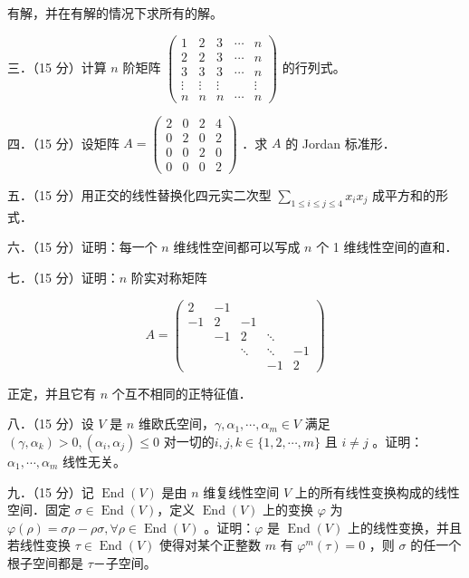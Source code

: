 \documentclass{article}
\begin{document}
有解，并在有解的情况下求所有的解。

三．（15 分）计算 \(n\) 阶矩阵 \(\left(\begin{array}{ccccc}1 & 2 & 3 & \cdots & n \\ 2 & 2 & 3 & \cdots & n \\ 3 & 3 & 3 & \cdots & n \\ \vdots & \vdots & \vdots & & \vdots \\ n & n & n & \cdots & n\end{array}\right)\) 的行列式。

四．（15 分）设矩阵 \(A=\left(\begin{array}{llll}2 & 0 & 2 & 4 \\ 0 & 2 & 0 & 2 \\ 0 & 0 & 2 & 0 \\ 0 & 0 & 0 & 2\end{array}\right)\) ．求 \(A\) 的 Jordan 标准形．

五．（15 分）用正交的线性替换化四元实二次型 \(\sum_{1 \leq i \leq j \leq 4} x_{i} x_{j}\) 成平方和的形式．

六．（15 分）证明：每一个 \(n\) 维线性空间都可以写成 \(n\) 个 1 维线性空间的直和．

七．（15 分）证明：\(n\) 阶实对称矩阵

\[
A=\left(\begin{array}{ccccc}
2 & -1 & & & \\
-1 & 2 & -1 & & \\
& -1 & 2 & \ddots & \\
& & \ddots & \ddots & -1 \\
& & & -1 & 2
\end{array}\right)
\]

正定，并且它有 \(n\) 个互不相同的正特征值．

八．（15 分）设 \(V\) 是 \(n\) 维欧氏空间，\(\gamma, \alpha_{1}, \cdots, \alpha_{m} \in V\) 满足 \(\left(\gamma, \alpha_{k}\right)>0,\left(\alpha_{i}, \alpha_{j}\right) \leq 0\) 对一切的\(i, j, k \in\{1,2, \cdots, m\}\) 且 \(i \neq j\) 。证明：\(\alpha_{1}, \cdots, \alpha_{m}\) 线性无关。

九．（15 分）记 \(\operatorname{End}(V)\) 是由 \(n\) 维复线性空间 \(V\) 上的所有线性变换构成的线性空间．固定 \(\sigma \in \operatorname{End}(V)\)，定义 \(\operatorname{End}(V)\) 上的变换 \(\varphi\) 为 \(\varphi(\rho)=\sigma \rho-\rho \sigma, \forall \rho \in \operatorname{End}(V)\) 。证明：\(\varphi\) 是 \(\operatorname{End}(V)\) 上的线性变换，并且若线性变换 \(\tau \in \operatorname{End}(V)\) 使得对某个正整数 \(m\) 有 \(\varphi^{m}(\tau)=0\) ，则 \(\sigma\) 的任一个根子空间都是 \(\tau\)－子空间。
\end{document}
